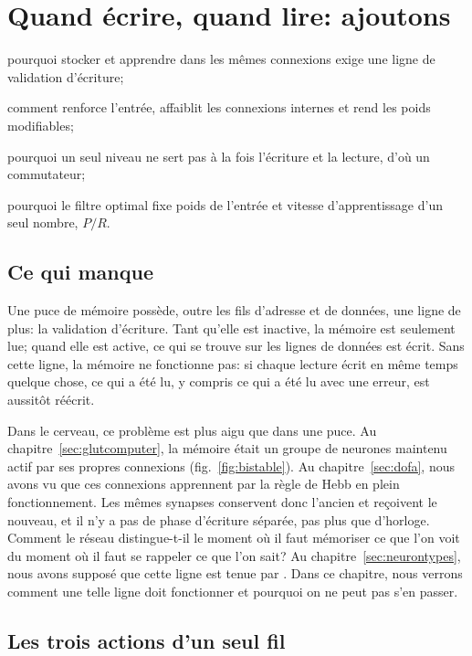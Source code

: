 \chapter{Quand écrire, quand lire: ajoutons }
\label{sec:acet}
\begin{chaptergoals}
\item pourquoi stocker et apprendre dans les mêmes connexions exige une ligne de validation d'écriture;
\item comment  renforce l'entrée, affaiblit les connexions internes et rend les poids modifiables;
\item pourquoi un seul niveau  ne sert pas à la fois l'écriture et la lecture, d'où un commutateur;
\item pourquoi le filtre optimal fixe poids de l'entrée et vitesse d'apprentissage d'un seul nombre, $P/R$.
\end{chaptergoals}

\section{Ce qui manque}

Une puce de mémoire possède, outre les fils d'adresse et de données, une ligne de plus: la validation d'écriture. Tant qu'elle est inactive, la mémoire est seulement lue; quand elle est active, ce qui se trouve sur les lignes de données est écrit. Sans cette ligne, la mémoire ne fonctionne pas: si chaque lecture écrit en même temps quelque chose, ce qui a été lu, y compris ce qui a été lu avec une erreur, est aussitôt réécrit.

Dans le cerveau, ce problème est plus aigu que dans une puce. Au chapitre~\ref{sec:glutcomputer}, la mémoire était un groupe de neurones  maintenu actif par ses propres connexions (fig.~\ref{fig:bistable}). Au chapitre~\ref{sec:dofa}, nous avons vu que ces connexions apprennent par la règle de Hebb en plein fonctionnement. Les mêmes synapses conservent donc l'ancien et reçoivent le nouveau, et il n'y a pas de phase d'écriture séparée, pas plus que d'horloge. Comment le réseau distingue-t-il le moment où il faut mémoriser ce que l'on voit du moment où il faut se rappeler ce que l'on sait? Au chapitre~\ref{sec:neurontypes}, nous avons supposé que cette ligne est tenue par . Dans ce chapitre, nous verrons comment une telle ligne doit fonctionner et pourquoi on ne peut pas s'en passer.

\section{Les trois actions d'un seul fil}

